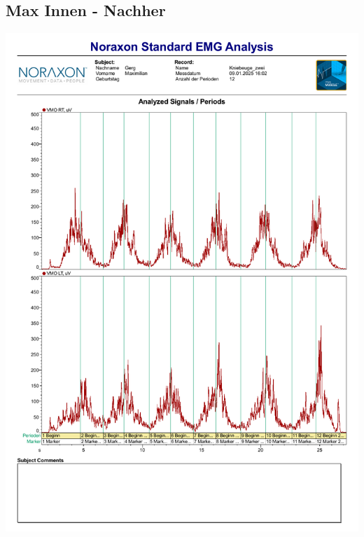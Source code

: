 \subsection*{Max Innen - Nachher}
\includegraphics[width=.9\textwidth]{img/pdfs/Max_2_innen.pdf}
\clearpage







